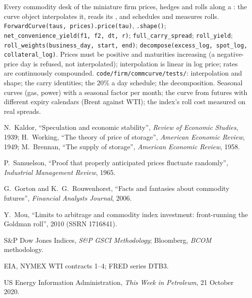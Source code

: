 \begin{build}
 Every commodity desk of the miniature firm prices, hedges and rolls along a : the curve object interpolates it, reads its , and schedules and measures rolls.
 \texttt{ForwardCurve(taus, prices).price(tau)}, \texttt{.shape()};
\texttt{net\_convenience\_yield(f1, f2, dt, r)}; \texttt{full\_carry\_spread}; \texttt{roll\_yield};
\texttt{roll\_weights(business\_day, start, end)}; \texttt{decompose(excess\_log, spot\_log,
collateral\_log)}.
 Prices must be positive and maturities increasing (a negative-price day is refused, not
interpolated); interpolation is linear in log price; rates are continuously compounded.
 \texttt{code/firm/commcurve/tests/}: interpolation and shape; the carry
identities; the 20\% a day schedule; the decomposition.
 Seasonal curves (gas, power) with a seasonal factor per month; the curve from futures
with different expiry calendars (Brent against WTI); the index's roll cost measured on real spreads.
\end{build}

\begin{omsources}
\item N.~Kaldor, ``Speculation and economic stability'', \emph{Review of Economic Studies}, 1939;
H.~Working, ``The theory of price of storage'', \emph{American Economic Review}, 1949; M.~Brennan,
``The supply of storage'', \emph{American Economic Review}, 1958.
\item P.~Samuelson, ``Proof that properly anticipated prices fluctuate randomly'', \emph{Industrial
Management Review}, 1965.
\item G.~Gorton and K.~G.~Rouwenhorst, ``Facts and fantasies about commodity futures'', \emph{Financial
Analysts Journal}, 2006.
\item Y.~Mou, ``Limits to arbitrage and commodity index investment: front-running the Goldman roll'',
2010 (SSRN 1716841).
\item S\&P Dow Jones Indices, \emph{S\&P GSCI Methodology}; Bloomberg, \emph{BCOM} methodology.
\item EIA, NYMEX WTI contracts 1--4; FRED series DTB3.
\item US Energy Information Administration, \emph{This Week in Petroleum}, 21 October 2020.
\end{omsources}

